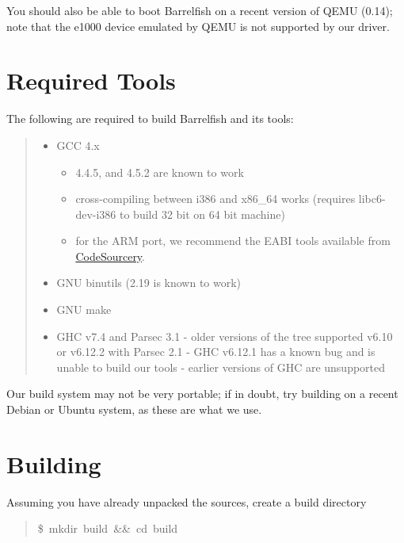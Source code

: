You should also be able to boot Barrelfish on a recent version of QEMU (0.14);
note that the e1000 device emulated by QEMU is not supported by our driver.


\section{Required Tools%
  \label{required-tools}%
}

The following are required to build Barrelfish and its tools:
%
\begin{quote}
%
\begin{itemize}

\item GCC 4.x
%
\begin{itemize}

\item 4.4.5, and 4.5.2 are known to work

\item cross-compiling between i386 and x86\_64 works (requires libc6-dev-i386
to build 32 bit on 64 bit machine)

\item for the ARM port, we recommend the EABI tools available from \href{http://www.codesourcery.com/sgpp/lite/arm}{CodeSourcery}.

\end{itemize}

\item GNU binutils (2.19 is known to work)

\item GNU make

\item GHC v7.4 and Parsec 3.1
- older versions of the tree supported v6.10 or v6.12.2 with Parsec 2.1
- GHC v6.12.1 has a known bug and is unable to build our tools
- earlier versions of GHC are unsupported

\end{itemize}

\end{quote}

Our build system may not be very portable; if in doubt, try building on a
recent Debian or Ubuntu system, as these are what we use.


\section{Building%
  \label{building}%
}
\begin{list}{.}
{
\setlength{\rightmargin}{\leftmargin}
}

\item Assuming you have already unpacked the sources, create a build directory
%
\begin{quote}{\ttfamily \raggedright \noindent
\$~mkdir~build~\&\&~cd~build
}
\end{quote}
\end{list}

